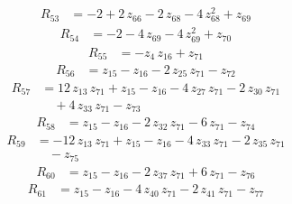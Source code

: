 \begin{equation*}\begin{aligned}
R_{53}&=-2 +2\,z_{66} -2\,z_{68} -4\,z_{68}^{2} +z_{69}
\end{aligned}\end{equation*}
\begin{equation*}\begin{aligned}
R_{54}&=-2 -4\,z_{69} -4\,z_{69}^{2} +z_{70}
\end{aligned}\end{equation*}
\begin{equation*}\begin{aligned}
R_{55}&=-z_{4}\,z_{16} +z_{71}
\end{aligned}\end{equation*}
\begin{equation*}\begin{aligned}
R_{56}&=z_{15} -z_{16} -2\,z_{25}\,z_{71} -z_{72}
\end{aligned}\end{equation*}
\begin{equation*}\begin{aligned}
R_{57}&=12\,z_{13}\,z_{71} +z_{15} -z_{16} -4\,z_{27}\,z_{71} -2\,z_{30}\,z_{71} \\
&\quad +4\,z_{33}\,z_{71} -z_{73}
\end{aligned}\end{equation*}
\begin{equation*}\begin{aligned}
R_{58}&=z_{15} -z_{16} -2\,z_{32}\,z_{71} -6\,z_{71} -z_{74}
\end{aligned}\end{equation*}
\begin{equation*}\begin{aligned}
R_{59}&=-12\,z_{13}\,z_{71} +z_{15} -z_{16} -4\,z_{33}\,z_{71} -2\,z_{35}\,z_{71} \\
&\quad -z_{75}
\end{aligned}\end{equation*}
\begin{equation*}\begin{aligned}
R_{60}&=z_{15} -z_{16} -2\,z_{37}\,z_{71} +6\,z_{71} -z_{76}
\end{aligned}\end{equation*}
\begin{equation*}\begin{aligned}
R_{61}&=z_{15} -z_{16} -4\,z_{40}\,z_{71} -2\,z_{41}\,z_{71} -z_{77}
\end{aligned}\end{equation*}
